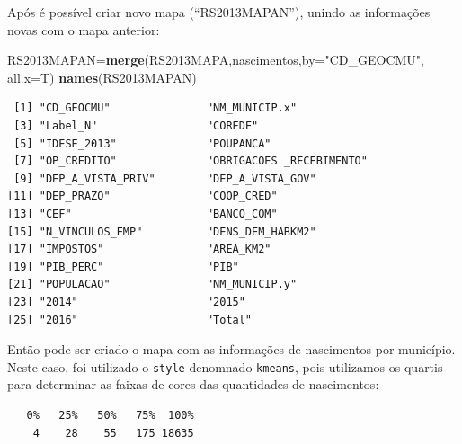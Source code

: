 \documentclass[12pt,brazil,oneside]{book}
\newenvironment{Shaded}{\begin{snugshade}}{\end{snugshade}}
\newcommand{\DataTypeTok}[1]{\textcolor[rgb]{0.13,0.29,0.53}{#1}}
\newcommand{\KeywordTok}[1]{\textcolor[rgb]{0.13,0.29,0.53}{\textbf{#1}}}
\newcommand{\NormalTok}[1]{#1}
\newcommand{\OperatorTok}[1]{\textcolor[rgb]{0.81,0.36,0.00}{\textbf{#1}}}
\newcommand{\StringTok}[1]{\textcolor[rgb]{0.31,0.60,0.02}{#1}}
\begin{document}
Após é possível criar novo mapa (``RS2013MAPAN''), unindo as informações novas com o mapa anterior:

\begin{Shaded}
\begin{Highlighting}[]
\NormalTok{RS2013MAPAN=}\KeywordTok{merge}\NormalTok{(RS2013MAPA,nascimentos,}\DataTypeTok{by=}\StringTok{"CD_GEOCMU"}\NormalTok{, }\DataTypeTok{all.x=}\NormalTok{T) }
\KeywordTok{names}\NormalTok{(RS2013MAPAN)}
\end{Highlighting}
\end{Shaded}

\begin{verbatim}
 [1] "CD_GEOCMU"               "NM_MUNICIP.x"           
 [3] "Label_N"                 "COREDE"                 
 [5] "IDESE_2013"              "POUPANCA"               
 [7] "OP_CREDITO"              "OBRIGACOES _RECEBIMENTO"
 [9] "DEP_A_VISTA_PRIV"        "DEP_A_VISTA_GOV"        
[11] "DEP_PRAZO"               "COOP_CRED"              
[13] "CEF"                     "BANCO_COM"              
[15] "N_VINCULOS_EMP"          "DENS_DEM_HABKM2"        
[17] "IMPOSTOS"                "AREA_KM2"               
[19] "PIB_PERC"                "PIB"                    
[21] "POPULACAO"               "NM_MUNICIP.y"           
[23] "2014"                    "2015"                   
[25] "2016"                    "Total"                  
\end{verbatim}

Então pode ser criado o mapa com as informações de nascimentos por município. Neste caso, foi utilizado o \texttt{style} denomnado \texttt{kmeans}, pois utilizamos os quartis para determinar as faixas de cores das quantidades de nascimentos:

\begin{Shaded}
\end{Shaded}

\begin{verbatim}
   0%   25%   50%   75%  100% 
    4    28    55   175 18635 
\end{verbatim}
\end{document}
